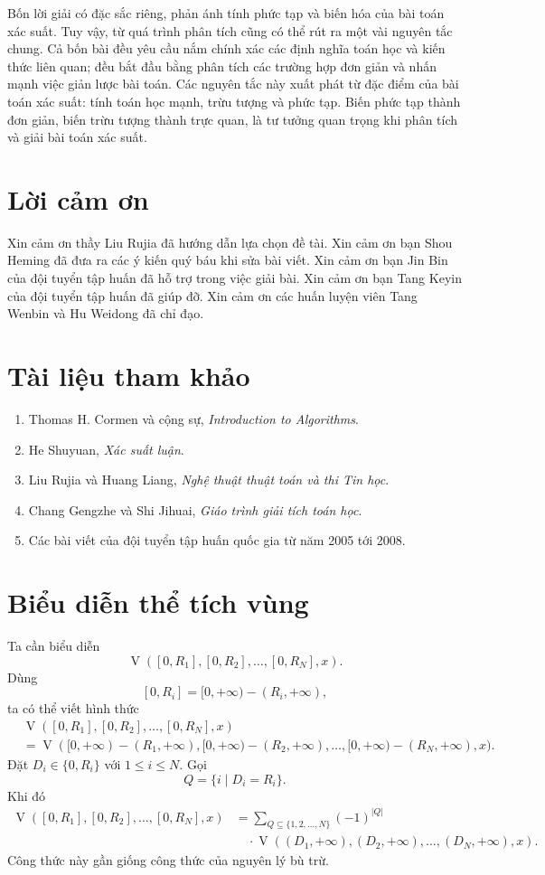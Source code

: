 \documentclass[11pt]{article}
\newcommand{\Vol}{\operatorname{V}}
\begin{document}
Bốn lời giải có đặc sắc riêng, phản ánh tính phức tạp và biến hóa của bài
toán xác suất. Tuy vậy, từ quá trình phân tích cũng có thể rút ra một vài
nguyên tắc chung. Cả bốn bài đều yêu cầu nắm chính xác các định nghĩa toán học
và kiến thức liên quan; đều bắt đầu bằng phân tích các trường hợp đơn giản và
nhấn mạnh việc giản lược bài toán. Các nguyên tắc này xuất phát từ đặc điểm
của bài toán xác suất: tính toán học mạnh, trừu tượng và phức tạp. Biến phức
tạp thành đơn giản, biến trừu tượng thành trực quan, là tư tưởng quan trọng
khi phân tích và giải bài toán xác suất.

\section*{Lời cảm ơn}

Xin cảm ơn thầy Liu Rujia đã hướng dẫn lựa chọn đề tài.
Xin cảm ơn bạn Shou Heming đã đưa ra các ý kiến quý báu khi sửa bài viết.
Xin cảm ơn bạn Jin Bin của đội tuyển tập huấn đã hỗ trợ trong việc giải bài.
Xin cảm ơn bạn Tang Keyin của đội tuyển tập huấn đã giúp đỡ.
Xin cảm ơn các huấn luyện viên Tang Wenbin và Hu Weidong đã chỉ đạo.

\section*{Tài liệu tham khảo}

\begin{enumerate}
  \item Thomas H. Cormen và cộng sự, \emph{Introduction to Algorithms}.
  \item He Shuyuan, \emph{Xác suất luận}.
  \item Liu Rujia và Huang Liang, \emph{Nghệ thuật thuật toán và thi Tin học}.
  \item Chang Gengzhe và Shi Jihuai, \emph{Giáo trình giải tích toán học}.
  \item Các bài viết của đội tuyển tập huấn quốc gia từ năm 2005 tới 2008.
\end{enumerate}

\appendix

\section{Biểu diễn thể tích vùng}

Ta cần biểu diễn
\[
  \Vol([0,R_1],[0,R_2],\ldots,[0,R_N],x).
\]
Dùng
\[
  [0,R_i]=[0,+\infty)-(R_i,+\infty),
\]
ta có thể viết hình thức
\[
\begin{aligned}
&\Vol([0,R_1],[0,R_2],\ldots,[0,R_N],x)\\
&=
\Vol([0,+\infty)-(R_1,+\infty),
     [0,+\infty)-(R_2,+\infty),
     \ldots,
     [0,+\infty)-(R_N,+\infty),x).
\end{aligned}
\]
Đặt \(D_i\in\{0,R_i\}\) với \(1\le i\le N\). Gọi
\[
  Q=\{i\mid D_i=R_i\}.
\]
Khi đó
\[
\begin{aligned}
\Vol([0,R_1],[0,R_2],\ldots,[0,R_N],x)
&=
\sum_{Q\subseteq\{1,2,\ldots,N\}}
(-1)^{|Q|}\\
&\quad\cdot
\Vol((D_1,+\infty),(D_2,+\infty),\ldots,(D_N,+\infty),x).
\end{aligned}
\]
Công thức này gần giống công thức của nguyên lý bù trừ.
\end{document}
